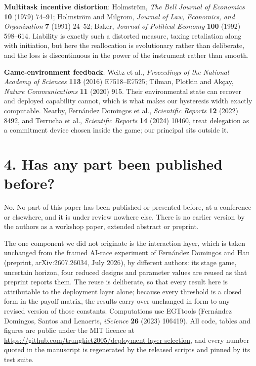 \documentclass[10pt,a4paper]{article}
\begin{document}
\textbf{Multitask incentive distortion}: Holmstr\"{o}m, \emph{The Bell Journal
of Economics} \textbf{10} (1979) 74--91; Holmstr\"{o}m and Milgrom,
\emph{Journal of Law, Economics, and Organization} \textbf{7} (1991) 24--52;
Baker, \emph{Journal of Political Economy} \textbf{100} (1992) 598--614.
Liability is exactly such a distorted measure, taxing retaliation along with
initiation, but here the reallocation is evolutionary rather than deliberate,
and the loss is discontinuous in the power of the instrument rather than
smooth.

\textbf{Game-environment feedback}: Weitz et al., \emph{Proceedings of the
National Academy of Sciences} \textbf{113} (2016) E7518--E7525; Tilman, Plotkin
and Ak\c{c}ay, \emph{Nature Communications} \textbf{11} (2020) 915. Their
environmental state can recover and deployed capability cannot, which is what
makes our hysteresis width exactly computable. Nearby, Fern\'{a}ndez Domingos
et al., \emph{Scientific Reports} \textbf{12} (2022) 8492, and Terrucha et al.,
\emph{Scientific Reports} \textbf{14} (2024) 10460, treat delegation as a
commitment device chosen inside the game; our principal sits outside it.

\section*{4. Has any part been published before?}

No. No part of this paper has been published or presented before, at a
conference or elsewhere, and it is under review nowhere else. There is no
earlier version by the authors as a workshop paper, extended abstract or
preprint.

The one component we did not originate is the interaction layer, which is taken
unchanged from the framed AI-race experiment of Fern\'{a}ndez Domingos and Han
(preprint, arXiv:2607.26034, July 2026), by different authors: its stage game,
uncertain horizon, four reduced designs and parameter values are reused as
that preprint reports them. The reuse is deliberate, so that every result here
is attributable to the deployment layer alone; because every threshold is a
closed form in the payoff matrix, the results carry over unchanged in form to
any revised version of those constants. Computations use EGTtools
(Fern\'{a}ndez Domingos, Santos and Lenaerts, \emph{iScience} \textbf{26}
(2023) 106419). All code, tables and figures are public under the MIT licence
at \url{https://github.com/trungkiet2005/deployment-layer-selection}, and every
number quoted in the manuscript is regenerated by the released scripts and
pinned by its test suite.
\end{document}
